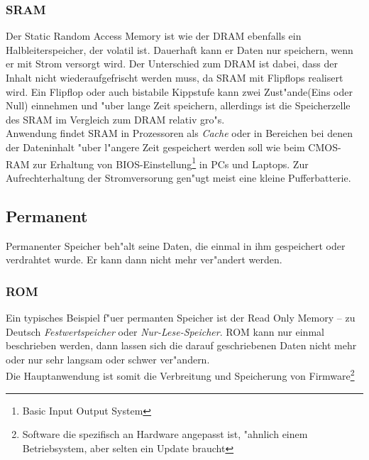 				\subsubsection{SRAM}
				\label{ch:Technisch:sec:Elektronische Speicherung:sub:Fl"uchtig:subsub:SRAM}
				
				Der \glqq Static Random Access Memory\grqq{} ist wie der DRAM ebenfalls ein Halbleiterspeicher, der volatil ist. Dauerhaft kann er Daten nur speichern, wenn er mit Strom versorgt wird. Der Unterschied zum DRAM ist dabei, dass der Inhalt nicht wiederaufgefrischt werden muss, da SRAM mit Flipflops realisert wird. Ein Flipflop oder auch bistabile Kippstufe kann zwei Zust"ande(Eins oder Null) einnehmen und "uber lange Zeit speichern, allerdings ist die Speicherzelle des SRAM im Vergleich zum DRAM relativ gro"s.
				\\
				Anwendung findet SRAM in Prozessoren als \textit{Cache} oder in Bereichen bei denen der Dateninhalt "uber l"angere Zeit gespeichert werden soll wie beim CMOS-RAM zur Erhaltung von BIOS-Einstellung\footnote[5]{Basic Input Output System} in PCs und Laptops. Zur Aufrechterhaltung der Stromversorung gen"ugt meist eine kleine Pufferbatterie.
        
        \subsection{Permanent}
        \label{ch:Technisch:sec:Elektronische Speicherung:sub:Permanent}
        
            Permanenter Speicher beh"alt seine Daten, die einmal in ihm gespeichert oder verdrahtet wurde. Er kann dann nicht mehr ver"andert werden.
			
				\subsubsection{ROM}
				\label{ch:Technisch:sec:Elektronische Speicherung:sub:Fl"uchtig:subsub:ROM}
				
				Ein typisches Beispiel f"uer permanten Speicher ist der \glqq Read Only Memory \grqq{} – zu Deutsch \textit{Festwertspeicher} oder \textit{Nur-Lese-Speicher}. ROM kann nur einmal beschrieben werden, dann lassen sich die darauf geschriebenen Daten nicht mehr oder nur sehr langsam oder schwer ver"andern. 
				\\
				Die Hauptanwendung ist somit die Verbreitung und Speicherung von Firmware\footnote[6]{Software die spezifisch an Hardware angepasst ist, "ahnlich einem Betriebsystem, aber selten ein Update braucht}
				
